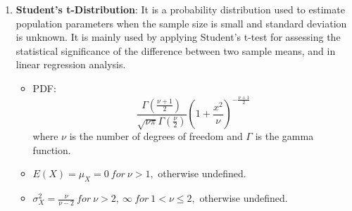 \documentclass[11pt, twocolumn]{article}
\begin{document}
\begin{enumerate}
\item \textbf{Student's t-Distribution}:  It is a probability distribution used to estimate population parameters when the sample size is small and standard deviation is unknown. It is mainly used by applying Student's t-test for assessing the statistical significance of the difference between two sample means, and in linear regression analysis. 
		\begin{itemize}
		\item PDF: $$ \frac{\Gamma (\frac{\nu+1}{2})}{\sqrt{\nu \pi} \Gamma (\frac{\nu}{2})} (1 + \frac{x^2}{\nu})^{-\frac{\nu+1}{2}}
$$ where $\nu$ is the number of degrees of freedom and $\Gamma$ is the gamma function.
		\item $E(X) = \mu_X = 	0 ~ for ~ \nu > 1,$ otherwise undefined.
		\item $\sigma_X^2 = \frac{\nu }{\nu -2} ~for~ \nu >2, ~\infty ~for~ 1 < \nu \le 2,$ otherwise undefined.
		\end{itemize} 
\end{enumerate}
\end{document}
